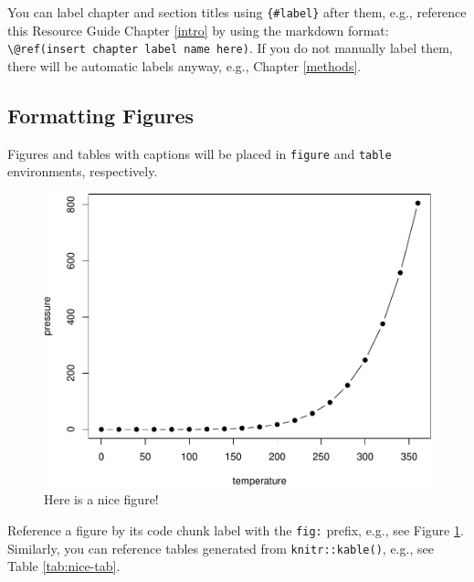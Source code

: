 \documentclass[
]{book}
\begin{document}
You can label chapter and section titles using \texttt{\{\#label\}} after them, e.g., reference this Resource Guide Chapter \ref{intro} by using the markdown format: \texttt{\textbackslash{}@ref(insert\ chapter\ label\ name\ here)}. If you do not manually label them, there will be automatic labels anyway, e.g., Chapter \ref{methods}.

\hypertarget{formatting-figures}{%
\subsection{Formatting Figures}\label{formatting-figures}}

Figures and tables with captions will be placed in \texttt{figure} and \texttt{table} environments, respectively.

\begin{figure}

{\centering \includegraphics[width=0.8\linewidth]{bookdown-demo_files/figure-latex/nice-fig-1} 

}

\caption{Here is a nice figure!}\label{fig:nice-fig}
\end{figure}

Reference a figure by its code chunk label with the \texttt{fig:} prefix, e.g., see Figure \ref{fig:nice-fig}. Similarly, you can reference tables generated from \texttt{knitr::kable()}, e.g., see Table \ref{tab:nice-tab}.
\end{document}
